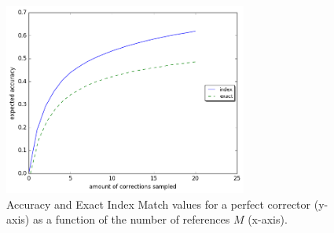 \documentclass[letter,11pt]{article}
\begin{document}
%
%
%
%

\begin{figure}
	\vspace{-1em}
  \includegraphics[width=8cm]{noSig_repeat_1000_accuracy}
  \caption{Accuracy and Exact Index Match values for a perfect corrector (y-axis)
    as a function of the number of references $M$ (x-axis).
  } \label{fig:accuracy_vals}
  \vspace{-0.5cm}
\end{figure}
\end{document}
